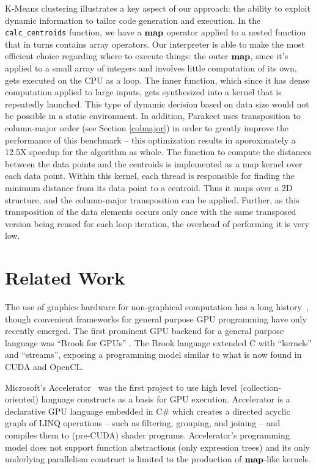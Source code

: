 \documentclass[preprint]{sigplanconf}
\begin{document}
K-Means clustering illustrates a key aspect of our approach: the ability to exploit dynamic information to tailor code generation and execution.  In the \texttt{calc\_centroids} function, we have a $\mbox{\textbf{map}}$ operator applied to a nested function that in turns contains array operators.  Our interpreter is able to make the most efficient choice regarding where to execute things: the outer $\mbox{\textbf{map}}$, since it's applied to a small array of integers and involves little computation of its own, gets executed on the CPU as a loop.  The inner function, which since it has dense computation applied to large inputs, gets synthesized into a kernel that is repeatedly launched.  This type of dynamic decision based on data size would not be possible in a static environment.  In addition, Parakeet uses transposition to column-major order (see Section \ref{colmajor}) in order to greatly improve the performance of this benchmark -- this optimization results in aporoximately a 12.5X speedup for the algorithm as whole. The function to compute the distances between the data points and the centroids is implemented as a map kernel over each data point.  Within this kernel, each thread is responsible for finding the minimum distance from its data point to a centroid.  Thus it maps over a 2D structure, and the column-major transposition can be applied.  Further, as this transposition of the data elements occurs only once with the same transposed version being reused for each loop iteration, the overhead of performing it is very low.

\section{Related Work}
\label{RelatedWork}
The use of graphics hardware for non-graphical computation has a  long history~\cite{Leng90}, though convenient frameworks for general purpose GPU programming have only recently emerged. The first prominent GPU backend for a general purpose language was ``Brook for GPUs'' \cite{Buck04}. The Brook language extended C with ``kernels'' and ``streams'', exposing a programming model similar to what is now found in CUDA and OpenCL.

Microsoft's Accelerator~\cite{Tard06} was the first project to use high level (collection-oriented) language constructs as a basis for GPU execution. Accelerator is a declarative GPU language embedded in C\# which creates a directed acyclic graph of LINQ operations -- such as filtering, grouping, and joining -- and compiles them to (pre-CUDA) shader programs. Accelerator's programming model does not support function abstractions (only expression trees) and its only underlying parallelism construct is limited to the production of $\mbox{\textbf{map}}$-like kernels.
\end{document}

